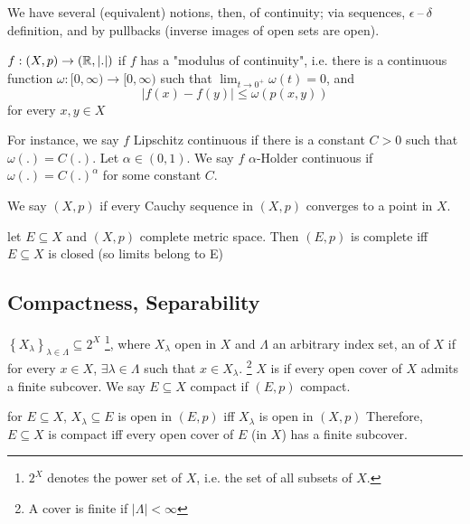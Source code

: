 \noindent We have several (equivalent) notions, then, of continuity; via sequences, 
$\epsilon \ \text{--} \ \delta$ definition, and by pullbacks (inverse images of open sets are open).

\begin{defn}
    $f : (X,p) \to (\mathbb{R}, \left| . \right| )$  if $f$ has a 
    "modulus of continuity", i.e. there is a continuous function 
    $\omega : [0, \infty) \to [0, \infty)$ such that $\lim_{t \to 0^{+}} \omega(t) = 0 $, and 
    \[
        \left| f(x) - f(y) \right|  \leq \omega(p(x, y))
    \]  
    for every $x, y \in X$ 
\end{defn}
\begin{rem}
    For instance, we say $f$ Lipschitz continuous if there is a constant 
    $C > 0$ such that $\omega(.) = C (.)$. Let $\alpha \in (0,1)$. 
    We say $f$ $\alpha$-Holder continuous if $\omega(.) = C(.)^\alpha$ for some constant $C$.      
\end{rem}
\begin{defn}[Completeness]
    We say $(X, p)$  if every Cauchy sequence in $(X, p)$ converges
    to a point in $X$. 
\end{defn}

\begin{rem}
    let $E \subseteq X$ and $(X, p)$ complete metric space. Then $(E, p)$ is complete iff
    $E \subseteq X$ is closed (so limits belong to E) 
\end{rem}  

\subsection{Compactness, Separability}

\begin{defn}
    $\left\{ X_\lambda \right\}_{\lambda \in \Lambda} \subseteq 2^X$
    \footnote{$2^X$ denotes the power set of $X$, i.e. the set of all subsets of $X$.},
    where $X_\lambda$ open in $X$ and $\Lambda$ an arbitrary index set, an  
    of $X$ if for every $x \in X$, $\exists \lambda \in \Lambda$ such that $x \in X_\lambda$.
    \footnote{A cover is finite if $\left| \Lambda \right| < \infty$ }
    $X$ is  if every open cover of $X$ admits a finite subcover. 
    We say $E \subseteq X$ compact if $(E, p)$ compact.  
\end{defn}

\begin{rem}
    for $E \subseteq X$, $X_\lambda \subseteq E$ is open in $(E, p)$ iff $X_\lambda$ is open in $(X, p)$
    Therefore, $E \subseteq X$ is compact iff every open cover of $E$ (in $X$) has a finite subcover.     
\end{rem}

